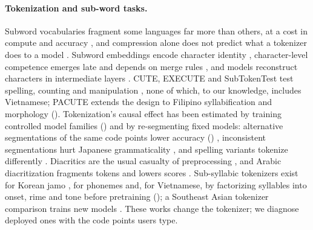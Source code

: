 \paragraph{Tokenization and sub-word tasks.}
Subword vocabularies \citep{P16-1162,D18-2012} fragment some languages far more than others, at a cost in compute and accuracy \citep{2021-acl-long-243,2023-emnlp-main-614,2023-findings-acl-350}, and compression alone does not predict what a tokenizer does to a model \citep{2023-acl-long-284,2024-emnlp-main-40,2024-findings-naacl-247}. Subword embeddings encode character identity \citep{2022-naacl-main-179,2022-naacl-main-373}, character-level competence emerges late and depends on merge rules \citep{2025-emnlp-main-1434,2026-eacl-long-282}, and models reconstruct characters in intermediate layers \citep{2025-findings-emnlp-719}. CUTE, EXECUTE and SubTokenTest test spelling, counting and manipulation \citep{2024-emnlp-main-177,2025-findings-acl-95,2026-acl-long-915}, none of which, to our knowledge, includes Vietnamese; PACUTE extends the design to Filipino syllabification and morphology (). Tokenization's causal effect has been estimated by training controlled model families \citep{2025-acl-long-1374} () and by re-segmenting fixed models: alternative segmentations of the same code points lower accuracy () \citep{ghosh-jyothi-2026-noncanonical}, inconsistent segmentations hurt Japanese grammaticality \citep{2025-acl-short-75}, and spelling variants tokenize differently \citep{2025-findings-acl-572}. Diacritics are the usual casualty of preprocessing \citep{2025-naacl-short-25}, and Arabic diacritization fragments tokens and lowers scores \citep{2026-findings-eacl-22}. Sub-syllabic tokenizers exist for Korean jamo \citep{2020-lrec-1-429}, for phonemes \citep{2026-acl-long-1872} and, for Vietnamese, by factorizing syllables into onset, rime and tone before pretraining (); a Southeast Asian tokenizer comparison trains new models \citep{2606.15044}. These works change the tokenizer; we diagnose deployed ones with the code points users type.


